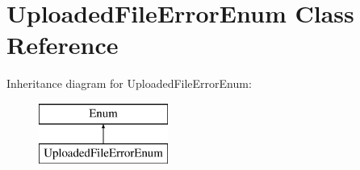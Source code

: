 \hypertarget{class_pes_1_1_http_1_1_uploaded_file_error_enum}{}\section{Uploaded\+File\+Error\+Enum Class Reference}
\label{class_pes_1_1_http_1_1_uploaded_file_error_enum}
Inheritance diagram for Uploaded\+File\+Error\+Enum\+:\begin{figure}[H]
\begin{center}
\leavevmode
\includegraphics[height=2.000000cm]{class_pes_1_1_http_1_1_uploaded_file_error_enum}
\end{center}
\end{figure}
